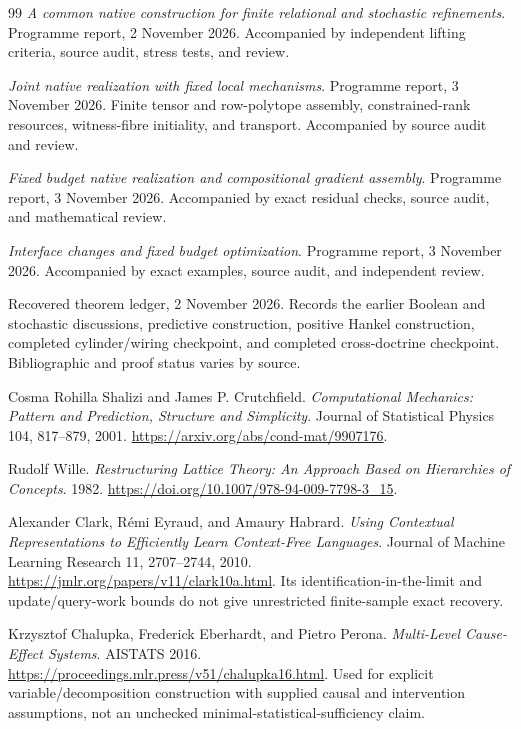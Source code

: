 \documentclass[11pt]{article}
\theoremstyle{remark}
\begin{document}
\begin{thebibliography}{99}
\emph{A common native construction for finite relational and stochastic refinements}.
Programme report, 2 November 2026. Accompanied by independent lifting criteria, source audit, stress tests, and review.

\emph{Joint native realization with fixed local mechanisms}.
Programme report, 3 November 2026. Finite tensor and row-polytope assembly, constrained-rank resources, witness-fibre initiality, and transport. Accompanied by source audit and review.

\emph{Fixed budget native realization and compositional gradient assembly}.
Programme report, 3 November 2026. Accompanied by exact residual checks, source audit, and mathematical review.

\emph{Interface changes and fixed budget optimization}.
Programme report, 3 November 2026. Accompanied by exact examples, source audit, and independent review.

Recovered theorem ledger, 2 November 2026.
Records the earlier Boolean and stochastic discussions, predictive construction, positive Hankel construction, completed cylinder/wiring checkpoint, and completed cross-doctrine checkpoint. Bibliographic and proof status varies by source.

Cosma Rohilla Shalizi and James P. Crutchfield.
\emph{Computational Mechanics: Pattern and Prediction, Structure and Simplicity}.
Journal of Statistical Physics 104, 817--879, 2001.
\url{https://arxiv.org/abs/cond-mat/9907176}.

Rudolf Wille. \emph{Restructuring Lattice Theory: An Approach Based on Hierarchies of Concepts}. 1982.
\url{https://doi.org/10.1007/978-94-009-7798-3_15}.

Alexander Clark, R\'emi Eyraud, and Amaury Habrard.
\emph{Using Contextual Representations to Efficiently Learn Context-Free Languages}.
Journal of Machine Learning Research 11, 2707--2744, 2010.
\url{https://jmlr.org/papers/v11/clark10a.html}.
Its identification-in-the-limit and update/query-work bounds do not give unrestricted finite-sample exact recovery.

Krzysztof Chalupka, Frederick Eberhardt, and Pietro Perona.
\emph{Multi-Level Cause-Effect Systems}. AISTATS 2016.
\url{https://proceedings.mlr.press/v51/chalupka16.html}.
Used for explicit variable/decomposition construction with supplied causal and intervention assumptions, not an unchecked minimal-statistical-sufficiency claim.


\end{thebibliography}
\end{document}
